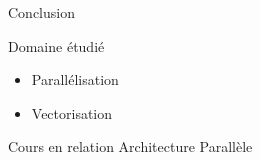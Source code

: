 \documentclass{beamer}
\begin{document}
\begin{frame}{Conclusion}

  \begin{block}{Domaine étudié}
    \begin{itemize}
    \item Parallélisation
    \item Vectorisation
    \end{itemize}
  \end{block}
  
  \begin{block}{Cours en relation}
    Architecture Parallèle
  \end{block}

\end{frame}
\end{document}
